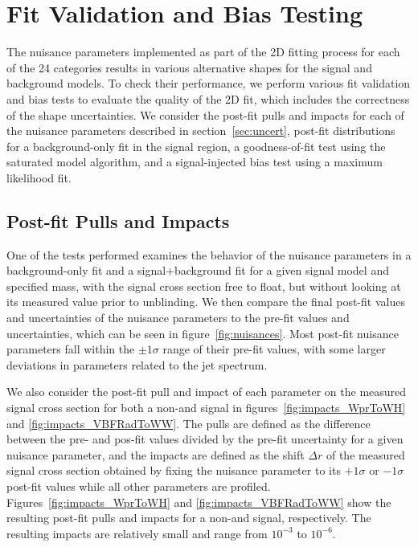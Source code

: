 
\section{Fit Validation and Bias Testing}
\label{sec:bias}

The nuisance parameters implemented as part of the 2D fitting process for each of the 24 categories results in various alternative shapes for the signal and background models.
To check their performance, we perform various fit validation and bias tests to evaluate the quality of the 2D fit, which includes the correctness of the shape uncertainties. %
We consider the post-fit pulls and impacts for each of the nuisance parameters described in section~\ref{sec:uncert}, post-fit distributions for a background-only fit in the signal region, a goodness-of-fit test using the saturated model algorithm, and a signal-injected bias test using a maximum likelihood fit.

\subsection{Post-fit Pulls and Impacts}

One of the tests performed examines the behavior of the nuisance parameters in a background-only fit and a signal+background fit for a given signal model and specified mass, with the signal cross section free to float, but without looking at its measured value prior to unblinding.
We then compare the final post-fit values and uncertainties of the nuisance parameters to the pre-fit values and uncertainties, which can be seen in figure~\ref{fig:nuisances}.
Most post-fit nuisance parameters fall within the $\pm1\sigma$ range of their pre-fit values, with some larger deviations in parameters related to the jet \pt spectrum.

We also consider the post-fit pull and impact of each parameter on the measured signal cross section for both a non-\VBF and \VBF signal in figures~\ref{fig:impacts_WprToWH} and \ref{fig:impacts_VBFRadToWW}.
The pulls are defined as the difference between the pre- and pos-fit values divided by the pre-fit uncertainty for a given nuisance parameter, and the impacts are defined as the shift $\Delta r$ of the measured signal cross section obtained by fixing the nuisance parameter to its $+1\sigma$ or $-1\sigma$ post-fit values while all other parameters are profiled.
Figures~\ref{fig:impacts_WprToWH} and \ref{fig:impacts_VBFRadToWW} show the resulting post-fit pulls and impacts for a non-\VBF and \VBF signal, respectively.
The resulting impacts are relatively small and range from $10^{-3}$ to $10^{-6}$.

